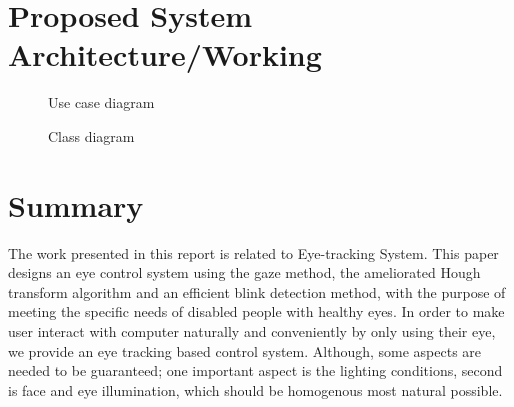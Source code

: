 \documentclass[12pt,singleside,a4paper]{article}
\begin{document}
\section*{Proposed System Architecture/Working}
\vspace{0.1mm}
%
\begin{figure}[h]
\begin{center}
\caption {Use case diagram}
\label{IDS}
\vspace*{\floatsep}
\end{center}
\caption {Class diagram}
\label{IDS}
\end{figure}
%

\newpage
\section*{Summary}
The work presented in this report is related to Eye-tracking System. This paper designs an eye control system using the gaze method, the ameliorated Hough transform algorithm and an efficient blink detection method, with the purpose of meeting the specific needs of disabled people with healthy eyes. In order to make user interact with computer naturally and conveniently by only using their eye, we provide an eye tracking based control system. Although, some aspects are needed to be guaranteed; one important aspect is the lighting conditions, second is face and eye illumination, which should be homogenous most natural possible.
\end{document}
